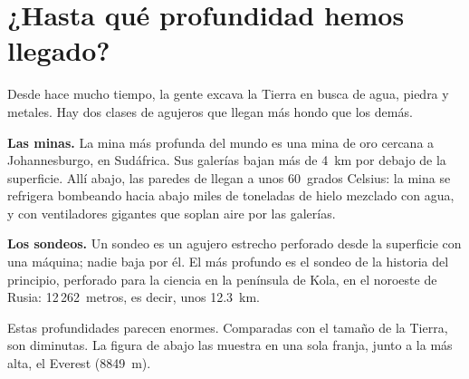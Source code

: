 \section{¿Hasta qué profundidad hemos llegado?}

Desde hace mucho tiempo, la gente excava la Tierra en busca de agua, piedra
y metales. Hay dos clases de agujeros que llegan más hondo que los demás.

\textbf{Las minas.} La mina más profunda del mundo es una mina de oro
cercana a Johannesburgo, en Sudáfrica. Sus galerías bajan más de 4~km por
debajo de la superficie. Allí abajo, las paredes de  llegan a unos
60~grados Celsius: la mina se refrigera bombeando hacia abajo miles de
toneladas de hielo mezclado con agua, y con ventiladores gigantes que
soplan aire por las galerías.

\textbf{Los sondeos.} Un sondeo es un agujero estrecho perforado desde la
superficie con una máquina; nadie baja por él. El más profundo es el sondeo
de la historia del principio, perforado para la ciencia en la península de Kola, en el noroeste de Rusia:
12\,262~metros, es decir, unos 12.3~km.

Estas profundidades parecen enormes. Comparadas con el tamaño de la
Tierra, son diminutas. La figura de abajo las muestra en una sola franja,
junto a la  más alta, el Everest (8849~m).

